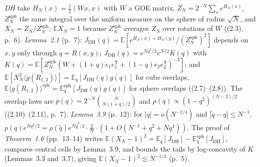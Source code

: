 \documentclass[11pt]{article}
\newcommand{\E}{\mathbb{E}}
\newcommand{\sloc}[2]{\cite[#2]{#1}}
\begin{document}
\emph{DH} \sloc{DuHuang2026-CriticalSKFreeEnergyFluctuations}{\S1, \S2.1} take
$H_N(x)=\frac12(Wx,x)$ with $W$ a GOE matrix,
$Z_N=2^{-N}\sum_xe^{H_N(x)}$, $Z_N^{\mathrm{sph}}$ the same integral over the
uniform measure on the sphere of radius $\sqrt N$, and
$X_N=Z_N/Z_N^{\mathrm{sph}}$; $\E X_N=1$ because $Z_N^{\mathrm{sph}}$ averages
$Z_N$ over rotations of $W$ ((2.3), p.~6). \emph{Lemma~2.1} (p.~7):
$J_{\mathrm{DH}}(q)=\E[e^{H_N(x)+H_N(y)}/(Z_N^{\mathrm{sph}})^2]$ depends on
$x,y$ only through $q=R(x,y)$; $J_{\mathrm{DH}}(q)=e^{Nq^2/2}e^{N/2}K(q)$ with
$K(q)=\E[Z_N^{\mathrm{sph}}(W+(1+q)e_1e_1^{\mathsf T}+(1-q)e_2e_2^{\mathsf
T})^{-2}]$; and
$\E[X_N^2\langle g(R_{1,2})\rangle]=\E_q[J_{\mathrm{DH}}(q)g(q)]$ for cube
overlaps,
$\E\langle g(R_{1,2})\rangle^{\mathrm{sph}}=\E_q^{\mathrm{sph}}[J_{\mathrm{DH}}(q)g(q)]$
for sphere overlaps ((2.7)--(2.8)). The overlap laws are
$p(q)=2^{-N}\binom{N}{N(1+q)/2}$ and $\rho(q)\propto(1-q^2)^{(N-3)/2}$
((2.10)--(2.11), p.~7). \emph{Lemma~3.9} (p.~12): for $|q|=o(N^{-1/4})$ and
$|\tilde q-q|\le N^{-1}$, $p(q)e^{Nq^2/2}=\rho(\tilde q)e^{N\tilde q^2/2}\cdot
\frac2N\cdot(1+O(N^{-1}+q^2+Nq^4))$. The proof of \emph{Theorem~1.6} (pp.~13--14)
writes $\E(X_N-1)^2=\E_q[J_{\mathrm{DH}}]-\E_q^{\mathrm{sph}}[J_{\mathrm{DH}}]$,
compares central cells by Lemma~3.9, and bounds the tails by log-concavity of
$K$ (Lemmas~3.3 and~3.7), giving $\E(X_N-1)^2\lesssim N^{-1/3}$ (p.~5).
\end{document}
